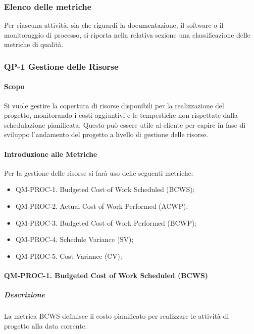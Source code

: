 	\subsubsection{Elenco delle metriche} 

	Per ciascuna attività, sia che riguardi la documentazione, il software o il monitoraggio di processo, si riporta nella relativa sezione una classificazione delle metriche di qualità.

	\subsubsection{QP-1 Gestione delle Risorse}

		\paragraph{Scopo}

		Si vuole gestire la copertura di risorse disponibili per la realizzazione del progetto, monitorando i costi aggiuntivi e le tempestiche non rispettate dalla schedulazione pianificata. Questo può essere utile al cliente per capire in fase di sviluppo l'andamento del progetto a livello di gestione delle risorse.

		\paragraph{Introduzione alle Metriche}

		Per la gestione delle risorse si farà uso delle seguenti metriche:

		\begin{itemize}
			\item QM-PROC-1. Budgeted Cost of Work Scheduled (BCWS);
			\item QM-PROC-2. Actual Cost of Work Performed (ACWP);
			\item QM-PROC-3. Budgeted Cost of Work Performed (BCWP);
			\item QM-PROC-4. Schedule Variance (SV);
			\item QM-PROC-5. Cost Variance (CV);
		\end{itemize}

		\paragraph{QM-PROC-1. Budgeted Cost of Work Scheduled (BCWS)}

			\subparagraph{Descrizione}
			La metrica BCWS definisce il costo pianificato per realizzare le attività di progetto alla data corrente.

